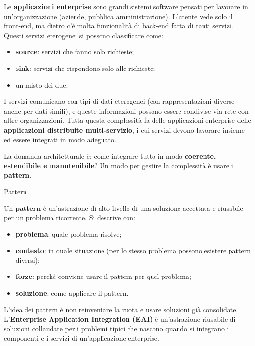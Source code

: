 Le \textbf{applicazioni enterprise} sono grandi sistemi software pensati
per lavorare in un'organizzazione (aziende, pubblica amministrazione).
L'utente vede solo il front-end, ma dietro c'è molta funzionalità di
back-end fatta di tanti servizi. Questi servizi eterogenei si possono
classificare come:

\begin{itemize}
\tightlist
\item
  \textbf{source}: servizi che fanno solo richieste;
\item
  \textbf{sink}: servizi che rispondono solo alle richieste;
\item
  un misto dei due.
\end{itemize}

I servizi comunicano con tipi di dati eterogenei (con rappresentazioni
diverse anche per dati simili), e queste informazioni possono essere
condivise via rete con altre organizzazioni. Tutta questa complessità fa
delle applicazioni enterprise delle \textbf{applicazioni distribuite
multi-servizio}, i cui servizi devono lavorare insieme ed essere
integrati in modo adeguato.

La domanda architetturale è: come integrare tutto in modo
\textbf{coerente, estendibile e manutenibile}? Un modo per gestire la
complessità è usare i \textbf{pattern}.

\begin{boxdefinition}{Pattern}

Un \textbf{pattern} è un'astrazione di alto livello di una soluzione
accettata e riusabile per un problema ricorrente. Si descrive con:

\begin{itemize}
\tightlist
\item
  \textbf{problema}: quale problema risolve;
\item
  \textbf{contesto}: in quale situazione (per lo stesso problema possono
  esistere pattern diversi);
\item
  \textbf{forze}: perché conviene usare il pattern per quel problema;
\item
  \textbf{soluzione}: come applicare il pattern.
\end{itemize}

\end{boxdefinition}

L'idea dei pattern è non reinventare la ruota e usare soluzioni già
consolidate. L'\textbf{Enterprise Application Integration (EAI)} è
un'astrazione riusabile di soluzioni collaudate per i problemi tipici
che nascono quando si integrano i componenti e i servizi di
un'applicazione enterprise.

